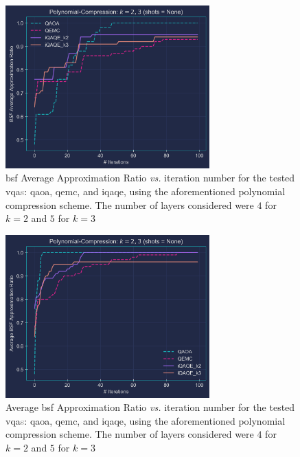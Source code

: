 \begin{figure}[H]
  \centering
  \includegraphics[width=0.70\textwidth]{Figures/Chapter_5/Polynomial_Compression_Base_k2_k3_2.png}
  \caption{\acrshort{bsf} Average Approximation Ratio \textit{vs.} iteration number for the tested \acrshort{vqa}\textcolor{gray}{s}: \acrshort{qaoa}, \acrshort{qemc}, and \acrshort{iqaqe}, using the aforementioned polynomial compression scheme. The number of layers considered were $4$ for $k = 2$ and $5$ for $k = 3$}
  \label{fig:Comparison_k2+k3_1}
\end{figure}

\begin{figure}[H]
  \centering
  \includegraphics[width=0.70\textwidth]{Figures/Chapter_5/Polynomial_Compression_Base_k2_k3_1.png}
  \caption{Average \acrshort{bsf} Approximation Ratio \textit{vs.} iteration number for the tested \acrshort{vqa}\textcolor{gray}{s}: \acrshort{qaoa}, \acrshort{qemc}, and \acrshort{iqaqe}, using the aforementioned polynomial compression scheme. The number of layers considered were $4$ for $k = 2$ and $5$ for $k = 3$}
  \label{fig:Comparison_k2+k3_2}
\end{figure}



